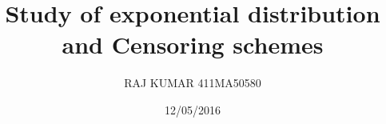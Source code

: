 \documentclass{beamer}
\title[About Beamer]
{Study of exponential distribution and Censoring schemes}
\author{RAJ KUMAR 411MA50580}
\institute{National Institute of Technology Rourkela}
\date{12/05/2016}
\begin{document}
	\frame{\titlepage}
	\begin{frame}
		
	\end{frame}
\end{document}
